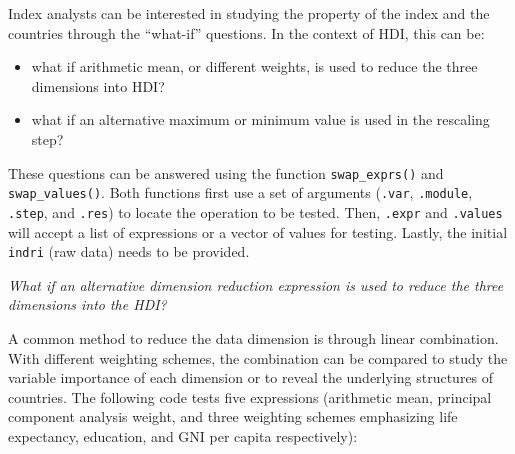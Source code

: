 \documentclass[
]{article}
\providecommand{\tightlist}{%
  \setlength{\itemsep}{0pt}\setlength{\parskip}{0pt}}\usepackage{longtable,booktabs,array}
\begin{document}
Index analysts can be interested in studying the property of the index
and the countries through the ``what-if'' questions. In the context of
HDI, this can be:

\begin{itemize}
\tightlist
\item
  what if arithmetic mean, or different weights, is used to reduce the
  three dimensions into HDI?
\item
  what if an alternative maximum or minimum value is used in the
  rescaling step?
\end{itemize}

These questions can be answered using the function
\texttt{swap\_exprs()} and \texttt{swap\_values()}. Both functions first
use a set of arguments (\texttt{.var}, \texttt{.module}, \texttt{.step},
and \texttt{.res}) to locate the operation to be tested. Then,
\texttt{.expr} and \texttt{.values} will accept a list of expressions or
a vector of values for testing. Lastly, the initial \texttt{indri} (raw
data) needs to be provided.

\emph{What if an alternative dimension reduction expression is used to
reduce the three dimensions into the HDI?}

A common method to reduce the data dimension is through linear
combination. With different weighting schemes, the combination can be
compared to study the variable importance of each dimension or to reveal
the underlying structures of countries. The following code tests five
expressions (arithmetic mean, principal component analysis weight, and
three weighting schemes emphasizing life expectancy, education, and GNI
per capita respectively):
\end{document}
